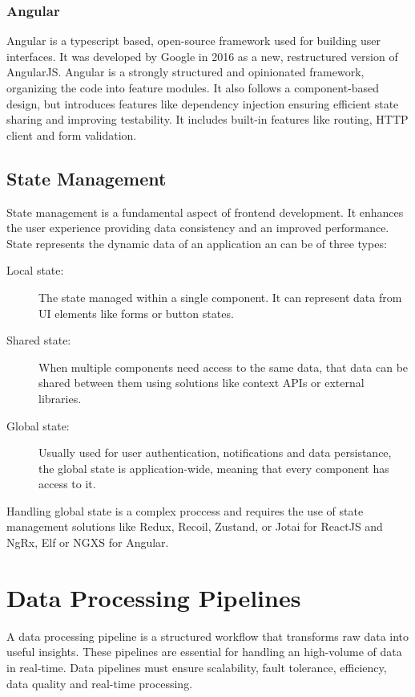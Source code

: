 \subsubsection{Angular}
Angular is a typescript based, open-source framework used for building user
interfaces. It was developed by Google in 2016 as a new, restructured version
of AngularJS. Angular is a strongly structured and opinionated framework,
organizing the code into feature modules. It also follows a component-based
design, but introduces features like dependency injection ensuring efficient
state sharing and improving testability.
It includes built-in features like routing, HTTP client and form validation.

\subsection{State Management}
State management is a fundamental aspect of frontend development. It enhances
the user experience providing data consistency and an improved performance.
State represents the dynamic data of an application an can be of three types:

\begin{description}

	\item[Local state:] The state managed within a single component. It can
	      represent data from UI elements like forms or button states.

	\item[Shared state:] When multiple components need access to the same data,
	      that data can be shared between them using solutions like context APIs or
	      external libraries.

	\item[Global state:] Usually used for user authentication, notifications and
	      data persistance, the global state is application-wide, meaning that
	      every component has access to it.
\end{description}

Handling global state is a complex proccess and requires the use of state
management solutions like Redux, Recoil, Zustand, or Jotai for ReactJS and
NgRx, Elf or NGXS for Angular.

\section{Data Processing Pipelines}
A data processing pipeline is a structured workflow that transforms raw data
into useful insights. These pipelines are essential for handling an high-volume
of data in real-time. Data pipelines must ensure scalability, fault tolerance,
efficiency, data quality and real-time processing.

